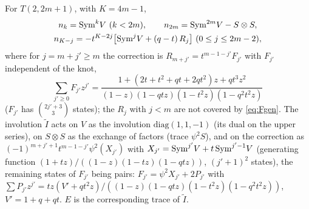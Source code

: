 \begin{conjecture}\label{conj:closedform}
For $T(2,2m+1)$, with $K = 4m-1$,
\begin{equation}\label{eq:nk}
\begin{gathered}
n_k = \mathrm{Sym}^kV\ (k<2m),\qquad n_{2m} = \mathrm{Sym}^{2m}V - S\otimes S,\\
n_{K-j} = -t^{K-2j}\bigl[\mathrm{Sym}^jV + (q-t)\,R_j\bigr]\ (0 \le j \le 2m-2),
\end{gathered}
\end{equation}
where for $j = m + j' \ge m$ the correction is $R_{m+j'} = t^{m-1-j'}F_{j'}$ with $F_{j'}$ independent of the knot,
\begin{equation}\label{eq:Fgen}
\sum_{j'\ge 0}F_{j'}z^{j'} = \frac{1 + (2t + t^2 + qt + 2qt^2)z + qt^3z^2}{(1-z)(1-qtz)(1-t^2z)(1-q^2t^2z)}
\end{equation}
($F_{j'}$ has $\binom{2j'+3}{3}$ states); the $R_j$ with $j < m$ are not covered by \eqref{eq:Fgen}. The involution $\tilde I$ acts on $V$ as the involution $\mathrm{diag}(1,1,-1)$ (its dual on the upper series), on $S\otimes S$ as the exchange of factors (trace $\psi^2 S$), and on the correction as $(-1)^{m+j'+1}t^{m-1-j'}\psi^2(X_{j'})$ with $X_{j'} = \mathrm{Sym}^{j'}V + t\,\mathrm{Sym}^{j'-1}V$ (generating function $(1+tz)/((1-z)(1-tz)(1-qtz))$, $(j'+1)^2$ states), the remaining states of $F_{j'}$ being pairs: $F_{j'} = \psi^2 X_{j'} + 2P_{j'}$ with $\sum P_{j'}z^{j'} = tz(V' + qt^2z)/((1-z)(1-qtz)(1-t^2z)(1-q^2t^2z))$, $V' = 1 + q + qt$. $E$ is the corresponding trace of $\tilde I$.
\end{conjecture}
